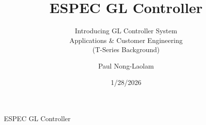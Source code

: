 \documentclass{beamer}
\title{ESPEC GL Controller}
\subtitle{Introducing GL Controller System \\ Applications \& Customer Engineering \\ (T-Series Background)}
\author{Paul Nong-Laolam}%
\institute[ESPEC NA, Inc.] %
{
  ESPEC North America, Inc. \\ 
  4141 Central Parkway \\
  Hudsonville, Michigan 49426 (USA) 
  }
\date{1/28/2026}
\begin{document}
\begin{frame}
  \titlepage
\end{frame}

\begin{frame}{ESPEC GL Controller}
  \tableofcontents
\end{frame}
%


%


\end{document}
